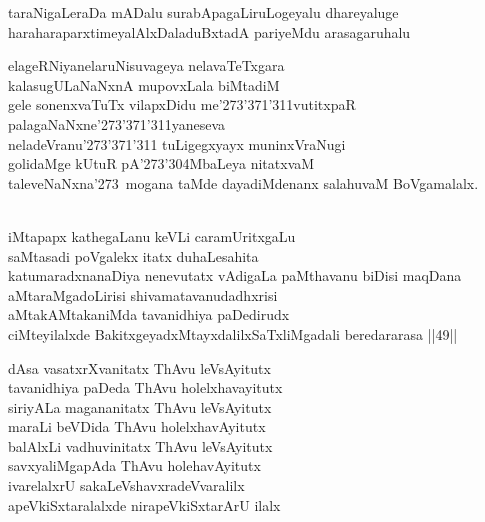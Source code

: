 \begin{entry}
\begin{shl}
taraNigaLeraDa mADalu surabApagaLiruLogeyalu dhareyaluge\\
haraharaparxtimeyalAlxDaladuBxtadA pariyeMdu arasagaruhalu
\end{shl}
\end{entry}

\begin{entry}
\gl{}
\begin{shl}
elageRNiyanelaruNisuvageya nelavaTeTxgara\\
kalasugULaNaNxnA mupovxLala biMtadiM\\
gele sonenxvaTuTx vilapxDidu me\char'273\char'371\char'311vutitxpaR
palagaNaNxne\char'273\char'371\char'311yaneseva\\ 
neladeVranu\char'273\char'371\char'311 tuLigegxyayx muninxVraNugi\\
golidaMge kUtuR pA\char'273\char'304MbaLeya nitatxvaM\\
taleveNaNxna\char'273\ mogana taMde dayadiMdenanx salahuvaM BoVgamalalx. 
\end{shl}
\end{entry}

\begin{entry}
\gl{}
\begin{shl}
\\
iMtapapx kathegaLanu keVLi caramUritxgaLu\\
saMtasadi poVgalekx itatx duhaLesahita\\
katumaradxnanaDiya nenevutatx vAdigaLa paMthavanu biDisi maqDana\\
aMtaraMgadoLirisi shivamatavanudadhxrisi\\
aMtakAMtakaniMda tavanidhiya paDedirudx\\
ciMteyilalxde BakitxgeyadxMtayxdalilxSaTxliMgadali beredararasa ||49||
\end{shl}
\begin{shl}
dAsa vasatxrXvanitatx ThAvu leVsAyitutx\\
tavanidhiya paDeda ThAvu holelxhavayitutx\\
siriyALa magananitatx ThAvu leVsAyitutx\\
maraLi beVDida ThAvu holelxhavAyitutx\\
balAlxLi vadhuvinitatx ThAvu leVsAyitutx\\
savxyaliMgapAda ThAvu holehavAyitutx\\
ivarelalxrU sakaLeVshavxradeVvaralilx\\
apeVkiSxtaralalxde nirapeVkiSxtarArU ilalx
\end{shl}
\end{entry}

